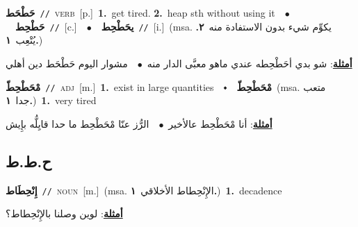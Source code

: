 \documentclass[10pt,a4paper,twoside]{article} %
\begin{document}
\begin{multicols}{2}
{\setlength\topsep{0pt}\textbf{\foreignlanguage{arabic}{حَطْحَط}}\ {\color{gray}\texttt{//}\color{black}}\ \textsc{verb}\ [p.]\ \textbf{1.}~get tired.  \textbf{2.}~heap sth without using it\ \ $\bullet$\ \ \setlength\topsep{0pt}\textbf{\foreignlanguage{arabic}{حَطْحِط}}\ {\color{gray}\texttt{//}\color{black}}\ [c.]\ \ $\bullet$\ \ \setlength\topsep{0pt}\textbf{\foreignlanguage{arabic}{يحَطْحِط}}\ {\color{gray}\texttt{//}\color{black}}\ [i.]\ \color{gray}(msa. \foreignlanguage{arabic}{يكوِّم شيء بدون الاستفادة منه}~\foreignlanguage{arabic}{\textbf{٢.}}  \foreignlanguage{arabic}{يُتْعِب}~\foreignlanguage{arabic}{\textbf{١.}})\color{black}\  \begin{flushright}\color{gray}\foreignlanguage{arabic}{\textbf{\underline{\foreignlanguage{arabic}{أمثلة}}}: شو بدي أحَطْحِطه عندي ماهو معبَّى الدار منه\ $\bullet$\ \  مشوار اليوم حَطْحَط دين أهلي}\end{flushright}\color{black}} \vspace{2mm}

{\setlength\topsep{0pt}\textbf{\foreignlanguage{arabic}{مْحَطْحِطّ}}\ {\color{gray}\texttt{//}\color{black}}\ \textsc{adj}\ [m.]\ \textbf{1.}~exist in large quantities\ \ $\smblkdiamond$\ \ \setlength\topsep{0pt}\textbf{\foreignlanguage{arabic}{مْحَطْحِطّ}}\ \color{gray}(msa. \foreignlanguage{arabic}{متعب جدا}~\foreignlanguage{arabic}{\textbf{١.}})\color{black}\ \textbf{1.}~very tired\  \begin{flushright}\color{gray}\foreignlanguage{arabic}{\textbf{\underline{\foreignlanguage{arabic}{أمثلة}}}: أنا مْحَطْحِط عالأخير\ $\bullet$\ \  الرُّز عنّا مْحَطْحِط ما حدا قايِلُّه بإِيش}\end{flushright}\color{black}} \vspace{2mm}

\vspace{-3mm}
\subsection*{\color{blue}\foreignlanguage{arabic}{ح.ط.ط}\color{blue}{}} 

{\setlength\topsep{0pt}\textbf{\foreignlanguage{arabic}{إِنْحِطَاط}}\ {\color{gray}\texttt{//}\color{black}}\ \textsc{noun}\ [m.]\ \color{gray}(msa. \foreignlanguage{arabic}{الإِنْحِطاط الأخلاقي}~\foreignlanguage{arabic}{\textbf{١.}})\color{black}\ \textbf{1.}~decadence\  \begin{flushright}\color{gray}\foreignlanguage{arabic}{\textbf{\underline{\foreignlanguage{arabic}{أمثلة}}}: لوين وصلنا بالإِنْحِطاط؟}\end{flushright}\color{black}} \vspace{2mm}


\end{multicols}
\end{document}
